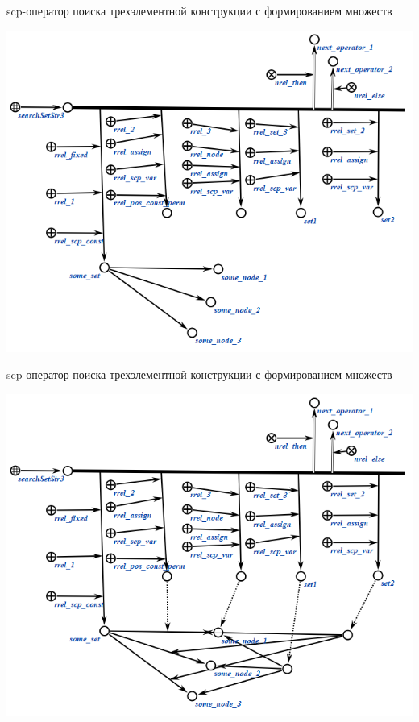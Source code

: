 \begin{frame}{scp-оператор поиска трехэлементной конструкции с формированием множеств}
	\topline
	\justifying
	\vspace{10mm}
	
	\begin{center}
		\includegraphics[scale=0.55]{figures/sd_scp/searchSetStr3_5.png}
	\end{center}
	
\end{frame}

\begin{frame}{scp-оператор поиска трехэлементной конструкции с формированием множеств}
	\topline
	\justifying
	\vspace{10mm}
	
	\begin{center}
		\includegraphics[scale=0.55]{figures/sd_scp/searchSetStr3_6.png}
	\end{center}
	
\end{frame}

